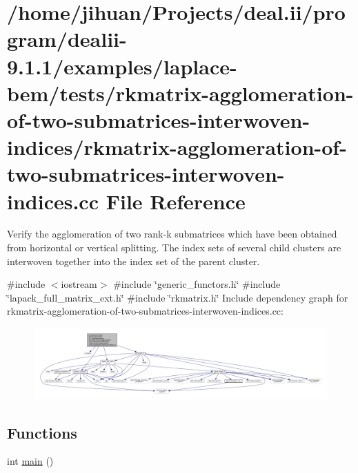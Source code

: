 \hypertarget{rkmatrix-agglomeration-of-two-submatrices-interwoven-indices_8cc}{}\section{/home/jihuan/\+Projects/deal.ii/program/dealii-\/9.1.1/examples/laplace-\/bem/tests/rkmatrix-\/agglomeration-\/of-\/two-\/submatrices-\/interwoven-\/indices/rkmatrix-\/agglomeration-\/of-\/two-\/submatrices-\/interwoven-\/indices.cc File Reference}
\label{rkmatrix-agglomeration-of-two-submatrices-interwoven-indices_8cc}


Verify the agglomeration of two rank-\/k submatrices which have been obtained from horizontal or vertical splitting. The index sets of several child clusters are interwoven together into the index set of the parent cluster.  


{\ttfamily \#include $<$iostream$>$}\newline
{\ttfamily \#include \char`\"{}generic\+\_\+functors.\+h\char`\"{}}\newline
{\ttfamily \#include \char`\"{}lapack\+\_\+full\+\_\+matrix\+\_\+ext.\+h\char`\"{}}\newline
{\ttfamily \#include \char`\"{}rkmatrix.\+h\char`\"{}}\newline
Include dependency graph for rkmatrix-\/agglomeration-\/of-\/two-\/submatrices-\/interwoven-\/indices.cc\+:
\nopagebreak
\begin{figure}[H]
\begin{center}
\leavevmode
\includegraphics[width=350pt]{rkmatrix-agglomeration-of-two-submatrices-interwoven-indices_8cc__incl}
\end{center}
\end{figure}
\subsection*{Functions}
\begin{DoxyCompactItemize}
\item 
int \hyperlink{rkmatrix-agglomeration-of-two-submatrices-interwoven-indices_8cc_ae66f6b31b5ad750f1fe042a706a4e3d4}{main} ()
\end{DoxyCompactItemize}


